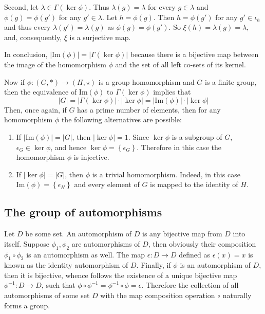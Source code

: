 \documentclass[a4paper]{article}
\newcommand{\obj}[1]{\left\{{#1}\right\}}
\newcommand{\brac}[1]{{\left({#1}\right)}}
\newcommand{\im}[1]{\ensuremath{\text{Im}\brac{ #1 }}}
\begin{document}
Second, let $\lambda\in \Gamma(\ker{\phi})$. Thus $\lambda(g)=\lambda$ for every $g\in \lambda$ and $\phi(g)=\phi(g')$ for any $g'\in \lambda$. Let $h=\phi(g)$. Then $h=\phi(g')$ for any $g'\in \iota_h$ and thus every $\lambda(g')=\lambda(g)$ as $\phi(g)=\phi(g')$. So $\xi(h)=\lambda(g)=\lambda$, and, consequently, $\xi$ is a surjective map.

In conclusion, $|\im{\phi}| = |\Gamma(\ker{\phi})|$ because there is a bijective map between the image of the homomorphism $\phi$ and the set of all left co-sets of its kernel.

Now if $\phi:\brac{G, \ast}\to \brac{H,\star}$ is a group homomorphism and $G$ is a finite group, then the equivalence of $\im{\phi}$ to $\Gamma(\ker{\phi})$ implies that \[|G| = |\Gamma(\ker{\phi})|\cdot |\ker{\phi}| = |\im{\phi}|\cdot |\ker{\phi}|\] Then, once again, if $G$ has a prime number of elements, then for any homomorphism $\phi$ the following alternatives are possible:
\begin{enumerate}
	\item If $|\im{\phi}|=|G|$, then $|\ker{\phi}| = 1$. Since $\ker{\phi}$ is a subgroup of $G$, $\epsilon_G\in \ker{\phi}$, and hence $\ker{\phi}=\obj{\epsilon_G}$. Therefore in this case the homomorphism $\phi$ is injective.
	\item If $|\ker{\phi}|=|G|$, then $\phi$ is a trivial homomorphism. Indeed, in this case $\im{\phi}=\obj{\epsilon_H}$ and every element of $G$ is mapped to the identity of $H$.
\end{enumerate}




\subsection{The group of automorphisms} %
\label{sub:the_group_of_automorphisms}
Let $D$ be some set. An automorphism of $D$ is any bijective map from $D$ into itself. Suppose $\phi_1, \phi_2$ are automorphisms of $D$, then obviously their composition $\phi_1\circ \phi_2$ is an automorphism as well. The map $\epsilon:D\to D$ defined as $\epsilon(x)=x$ is known as the identity automorphism of $D$. Finally, if $\phi$ is an automorphism of $D$, then it is bijective, whence follows the existence of a unique bijective map $\phi^{-1}:D\to D$, such that $\phi\circ\phi^{-1} = \phi^{-1}\circ \phi = \epsilon$. Therefore the collection of all automorphisms of some set $D$ with the map composition operation $\circ$ naturally forms a group.
\end{document}

